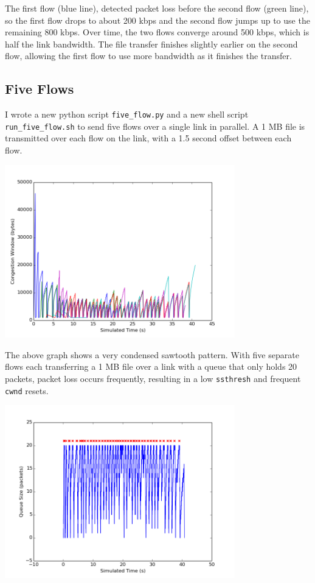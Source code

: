 \documentclass[11pt]{article}
\newcommand{\code}[1]{\texttt{#1}}
\begin{document}
The first flow (blue line), detected packet loss before the second flow (green line), so the first flow drops to about 200 kbps and the second flow jumps up to use the remaining 800 kbps. Over time, the two flows converge around 500 kbps, which is half the link bandwidth. The file transfer finishes slightly earlier on the second flow, allowing the first flow to use more bandwidth as it finishes the transfer.

\subsection{Five Flows}
I wrote a new python script \code{five\_flow.py} and a new shell script \code{run\_five\_flow.sh} to send five flows over a single link in parallel. A 1 MB file is transmitted over each flow on the link, with a 1.5 second offset between each flow.

\includegraphics[width=10cm]{../graphs/five_flow_cwnd.png}

The above graph shows a very condensed sawtooth pattern. With five separate flows each transferring a 1 MB file over a link with a queue that only holds 20 packets, packet loss occurs frequently, resulting in a low \code{ssthresh} and frequent \code{cwnd} resets.

\includegraphics[width=10cm]{../graphs/five_flow_queue_size.png}
\end{document}
